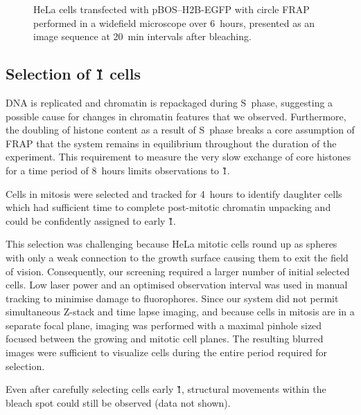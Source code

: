    \begin{figure}
     \centering
       {HeLa cells transfected with pBOS--H2B-EGFP with circle FRAP performed 
       in a widefield microscope over 6~hours, presented as an image sequence 
       at 20~min intervals after bleaching.}
     \label{fig:kill-frap:frap-spot-movement}
   \end{figure}

    \subsection{Selection of \G1{} cells}

    DNA is replicated and chromatin is repackaged during S~phase,
    suggesting a possible cause for changes in chromatin features that we observed. 
    Furthermore, the doubling of histone content as a result of S~phase breaks
    a core assumption of FRAP that the system remains in equilibrium
    throughout the duration of the experiment.
    This requirement to measure the very slow exchange of core histones
    for a time period of 8~hours limits observations to \G1{}.

    Cells in mitosis were selected and tracked for 4~hours to identify daughter cells
    which had sufficient time to complete post-mitotic chromatin unpacking
    and could be confidently assigned to early \G1{}.

    This selection was challenging because HeLa mitotic cells round up
    as spheres with only a weak connection to the growth surface
    causing them to exit the field of vision.
    Consequently, our screening required a larger number of initial selected cells. 
    Low laser power and an optimised observation interval 
    was used in manual tracking to minimise damage to fluorophores.
    Since our system did not permit simultaneous Z-stack and time lapse imaging, 
    and because cells in mitosis are in a separate focal plane,
    imaging was performed with a maximal pinhole sized focused 
    between the growing and mitotic cell planes.
    The resulting blurred images were sufficient to visualize cells during
    the entire period required for selection.

    Even after carefully selecting cells early \G1{},
    structural movements within the bleach spot could still be observed (data not shown).

